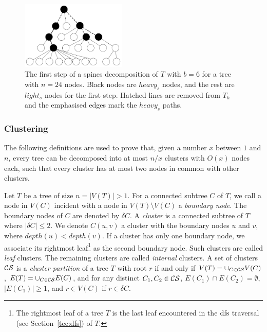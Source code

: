 				\begin{figure}[!ht]
				\centering
				\includegraphics[width=50mm]{./Figures/Ladder_decomp.pdf}
				\caption{The first step of a  spines decomposition  of $T$ with $b=6$ for a tree with $n=24$ nodes. Black nodes are $heavy_s$ nodes, and the rest are $light_s$ nodes for the first step. Hatched lines are removed from $T_h$  and the emphasised edges mark the $heavy_s$ paths.}
				\label{fig:ladder}
			\end{figure}
			 

\subsubsection{Clustering}\label{tec:clustering}
The following  definitions are used to prove  that, given a number $x$ between $1$ and $n$, every tree can be decomposed into at most $n/x$ clusters with $O(x)$ nodes each, such that every cluster has at most two nodes in common with other clusters.

\begin{definition} \label{dfn:cluster}
Let $T$ be a tree of size $n = \vert V(T) \vert >1$.
 For a connected subtree $C$ of $T$, we call a node in $V(C)$ incident with a node in $V(T) \setminus V(C)$ a \emph{boundary node}.
The boundary nodes of $C$ are denoted by $\delta C$. 
A \emph{cluster} is a connected subtree of $T$ where $\vert \delta C \vert \leq 2$.
We denote $C(u,v)$ a cluster with the boundary nodes $u$ and $v$, where $depth(u)< depth(v)$.
If a cluster has only one boundary node, we associate  its rightmost leaf\footnote{The rightmost leaf of a tree $T$ is the last leaf encountered in the $\operatorname{dfs}$ traversal (see Section~\ref{tec:dfs}) of $T$.}  as the second boundary node.
Such clusters are called \emph{leaf} clusters. The remaining clusters are called \emph{internal} clusters.
 A set of clusters $ \mathcal{CS}$ is a \emph{cluster partition} of a tree $T$ with root $r$ if and only if $V(T) = \cup_{C \in  \mathcal{CS}}V(C)$, $E(T)= \cup_{C \in  \mathcal{CS}} E(C) $, and for any distinct $C_1,C_2 \in  \mathcal{CS}$, $E(C_1) \cap E(C_2) = \emptyset$, $\vert E(C_1) \vert \geq 1$, and $ r \in V(C)$ if $r \in \delta C$. 
\end{definition}

